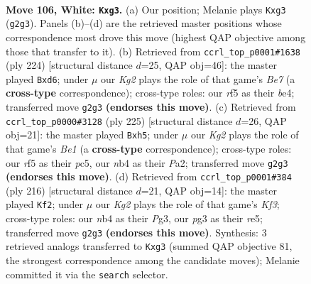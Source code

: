 \documentclass[11pt]{article}
\begin{document}
\clearpage

\begin{figure}[p]\centering
\begin{subfigure}{0.46\textwidth}\centering
\resizebox{\linewidth}{!}{%
\newchessgame
\chessboard[
  setfen={5k2/5p2/6p1/4Pr2/1n6/1B4p1/6K1/8 w - - 2 106},
  showmover=false,
  pgfstyle=straightmove, color=movearrow, markmove={g2-g3}
]}
\caption{}
\end{subfigure}\hfill
\begin{subfigure}{0.46\textwidth}\centering
\resizebox{\linewidth}{!}{%
\newchessgame
\chessboard[
  setfen={8/4B3/1k1p4/3Pp2p/4b2K/8/8/8 w - - 0 113},
  showmover=false,
  pgfstyle=straightmove, color=movearrow, markmove={e7-d6}
]}
\caption{}
\end{subfigure}
\\[4pt]
\begin{subfigure}{0.46\textwidth}\centering
\resizebox{\linewidth}{!}{%
\newchessgame
\chessboard[
  setfen={4b3/8/4p2k/2P4P/5P1K/8/p7/B7 b - - 8 113},
  showmover=false,
  pgfstyle=straightmove, color=movearrow, markmove={e8-h5}
]}
\caption{}
\end{subfigure}\hfill
\begin{subfigure}{0.46\textwidth}\centering
\resizebox{\linewidth}{!}{%
\newchessgame
\chessboard[
  setfen={8/2R2pk1/4p3/4r3/8/1B3KP1/8/8 w - - 72 109},
  showmover=false,
  pgfstyle=straightmove, color=movearrow, markmove={f3-f2}
]}
\caption{}
\end{subfigure}
\caption{\textbf{Move 106, White: \texttt{Kxg3}.} (a) Our position; Melanie plays \texttt{Kxg3} (\texttt{g2g3}). Panels (b)--(d) are the retrieved master positions whose correspondence most drove this move (highest QAP objective among those that transfer to it). (b) Retrieved from \texttt{ccrl\_top\_p0001\#1638} (ply 224) [structural distance $d$=25, QAP obj=46]: the master played \texttt{Bxd6}; under $\mu$ our \emph{Kg2} plays the role of that game's \emph{Be7} (a \textbf{cross-type} correspondence); cross-type roles: our \emph{r}f5 as their \emph{b}e4; transferred move \texttt{g2g3} \textbf{(endorses this move)}. (c) Retrieved from \texttt{ccrl\_top\_p0000\#3128} (ply 225) [structural distance $d$=26, QAP obj=21]: the master played \texttt{Bxh5}; under $\mu$ our \emph{Kg2} plays the role of that game's \emph{Be1} (a \textbf{cross-type} correspondence); cross-type roles: our \emph{r}f5 as their \emph{p}c5, our \emph{n}b4 as their \emph{P}a2; transferred move \texttt{g2g3} \textbf{(endorses this move)}. (d) Retrieved from \texttt{ccrl\_top\_p0001\#384} (ply 216) [structural distance $d$=21, QAP obj=14]: the master played \texttt{Kf2}; under $\mu$ our \emph{Kg2} plays the role of that game's \emph{Kf3}; cross-type roles: our \emph{n}b4 as their \emph{P}g3, our \emph{p}g3 as their \emph{r}e5; transferred move \texttt{g2g3} \textbf{(endorses this move)}. Synthesis: 3 retrieved analogs transferred to \texttt{Kxg3} (summed QAP objective 81, the strongest correspondence among the candidate moves); Melanie committed it via the \texttt{search} selector.}
\label{fig:thought-m210}
\end{figure}
\end{document}
